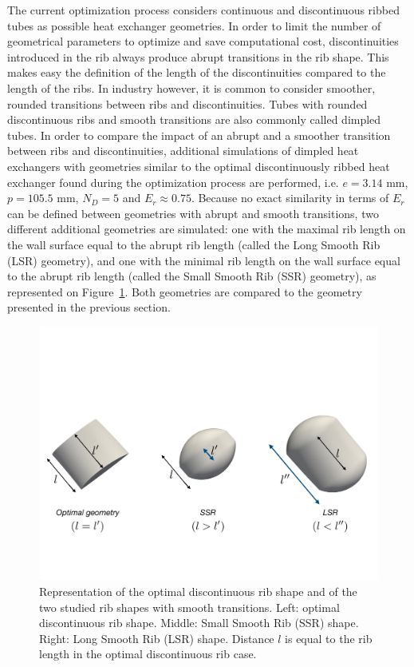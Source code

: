 The current optimization process considers continuous and discontinuous ribbed tubes as possible heat exchanger geometries. In order to limit the number of geometrical parameters to optimize and save computational cost, discontinuities introduced in the rib always produce abrupt transitions in the rib shape. This makes easy the definition of the length of the discontinuities compared to the length of the ribs. In industry however, it is common to consider smoother, rounded transitions between ribs and discontinuities. Tubes with rounded discontinuous ribs and smooth transitions are also commonly called dimpled tubes. In order to compare the impact of an abrupt and a smoother transition between ribs and discontinuities, additional simulations of dimpled heat exchangers with geometries similar to the optimal discontinuously ribbed heat exchanger found during the optimization process are performed, i.e. $e=3.14$ mm, $p=105.5$ mm, $N_D=5$ and $E_r \approx 0.75$. Because no exact similarity in terms of $E_r$ can be defined between geometries with abrupt and smooth transitions, two different additional geometries are simulated: one with the maximal rib length on the wall surface equal to the abrupt rib length (called the Long Smooth Rib (LSR) geometry), and one with the minimal rib length on the wall surface equal to the abrupt rib length (called the Small Smooth Rib (SSR) geometry), as represented on Figure~\ref{rib_shapes}. Both geometries are compared to the geometry presented in the previous section.\\

\begin{figure}[h]
\centering
\includegraphics[width=14cm]{fig/applications/optim/rib_shapes.pdf}
\caption{Representation of the optimal discontinuous rib shape and of the two studied rib shapes with smooth transitions. Left: optimal discontinuous rib shape. Middle: Small Smooth Rib (SSR) shape. Right: Long Smooth Rib (LSR) shape. Distance $l$ is equal to the rib length in the optimal discontinuous rib case.}
\label{rib_shapes}
\end{figure}

